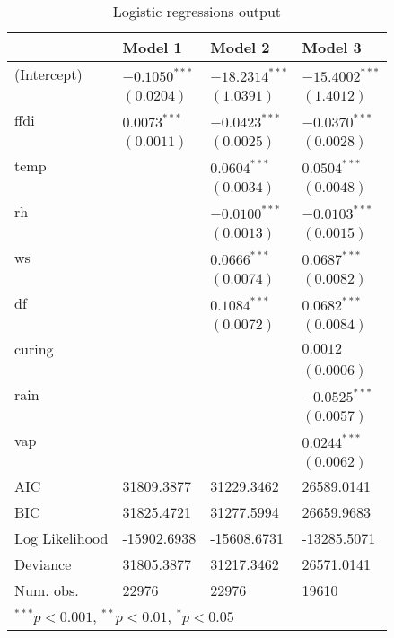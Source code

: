 \documentclass[11pt,a4paper]{article}
\begin{document}
\begin{table}
	\begin{center}
		\begin{tabular}{llll}
			\toprule
			& Model 1 & Model 2 & Model 3 \\
		\midrule
		(Intercept)    & $-0.1050^{***}$ & $-18.2314^{***}$ & $-15.4002^{***}$ \\
		& $(0.0204)$      & $(1.0391)$       & $(1.4012)$       \\
		ffdi           & $0.0073^{***}$  & $-0.0423^{***}$  & $-0.0370^{***}$  \\
		& $(0.0011)$      & $(0.0025)$       & $(0.0028)$       \\
		temp           &                 & $0.0604^{***}$   & $0.0504^{***}$   \\
		&                 & $(0.0034)$       & $(0.0048)$       \\
		rh             &                 & $-0.0100^{***}$  & $-0.0103^{***}$  \\
		&                 & $(0.0013)$       & $(0.0015)$       \\
		ws             &                 & $0.0666^{***}$   & $0.0687^{***}$   \\
		&                 & $(0.0074)$       & $(0.0082)$       \\
		df             &                 & $0.1084^{***}$   & $0.0682^{***}$   \\
		&                 & $(0.0072)$       & $(0.0084)$       \\
		curing         &                 &                  & $0.0012$         \\
		&                 &                  & $(0.0006)$       \\
		rain           &                 &                  & $-0.0525^{***}$  \\
		&                 &                  & $(0.0057)$       \\
		vap            &                 &                  & $0.0244^{***}$   \\
		&                 &                  & $(0.0062)$       \\
		\midrule
		AIC            & 31809.3877      & 31229.3462       & 26589.0141       \\
		BIC            & 31825.4721      & 31277.5994       & 26659.9683       \\
		Log Likelihood & -15902.6938     & -15608.6731      & -13285.5071      \\
		Deviance       & 31805.3877      & 31217.3462       & 26571.0141       \\
		Num. obs.      & 22976           & 22976            & 19610            \\
		\bottomrule
		\multicolumn{4}{l}{\scriptsize{$^{***}p<0.001$, $^{**}p<0.01$, $^*p<0.05$}}
	\end{tabular}
	\caption{Logistic regressions output}
	\label{table:coefficients}
\end{center}
\end{table}
\end{document}

